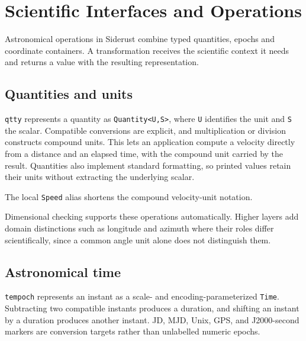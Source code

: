 \section{Scientific Interfaces and Operations}

Astronomical operations in Siderust combine typed quantities, epochs and coordinate containers. A
transformation receives the scientific context it needs and returns a value with the resulting
representation.

\subsection{Quantities and units}

\texttt{qtty} represents a quantity as \texttt{Quantity<U,S>}, where
\texttt{U} identifies the unit and \texttt{S} the scalar. Compatible
conversions are explicit, and multiplication or division constructs compound
units. This lets an application compute a velocity directly from a distance and an
elapsed time, with the compound unit carried by the result. Quantities also
implement standard formatting, so printed values retain their units without
extracting the underlying scalar.



The local \texttt{Speed} alias shortens the compound velocity-unit notation.

Dimensional checking supports these operations automatically. Higher layers add domain distinctions
such as longitude and azimuth where their roles differ scientifically, since a common angle unit
alone does not distinguish them.

\subsection{Astronomical time}

\texttt{tempoch} represents an instant as a scale- and encoding-parameterized
\texttt{Time}. Subtracting two compatible instants produces a duration, and
shifting an instant by a duration produces another instant. JD, MJD, Unix, GPS,
and J2000-second markers are conversion targets rather than unlabelled numeric
epochs.



